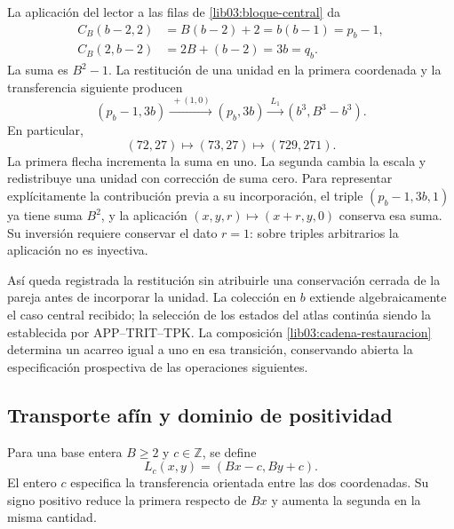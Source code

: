 La aplicación del lector a las filas de \eqref{lib03:bloque-central} da
\begin{align}
 C_B(b-2,2)&=B(b-2)+2=b(b-1)=p_b-1,\\
 C_B(2,b-2)&=2B+(b-2)=3b=q_b.
 \label{lib03:concatenaciones}
\end{align}
La suma es \(B^2-1\). La restitución de una unidad en la primera
coordenada y la transferencia siguiente producen
\begin{equation}
 (p_b-1,3b)\xrightarrow{\ +(1,0)\ }(p_b,3b)
 \xrightarrow{\ L_1\ }(b^3,B^3-b^3).
 \label{lib03:cadena-restauracion}
\end{equation}
En particular,
\begin{equation}
 (72,27)\longmapsto(73,27)\longmapsto(729,271).
 \label{lib03:cadena-central}
\end{equation}
La primera flecha incrementa la suma en uno. La segunda cambia la escala
y redistribuye una unidad con corrección de suma cero. Para representar
explícitamente la contribución previa a su incorporación, el triple
\((p_b-1,3b,1)\) ya tiene suma \(B^2\), y la aplicación
\((x,y,r)\mapsto(x+r,y,0)\) conserva esa suma. Su inversión requiere
conservar el dato \(r=1\): sobre triples arbitrarios la aplicación no
es inyectiva.

Así queda registrada la restitución sin atribuirle una conservación
cerrada de la pareja antes de incorporar la unidad. La colección en \(b\)
extiende algebraicamente el caso central recibido; la selección de los
estados del atlas continúa siendo la establecida por APP--TRIT--TPK.
La composición \eqref{lib03:cadena-restauracion} determina un acarreo
igual a uno en esa transición, conservando abierta la especificación
prospectiva de las operaciones siguientes.

\subsection{Transporte afín y dominio de positividad}
\label{lib03:afin}

\begin{definition}
\label{lib03:def-transporte}
Para una base entera \(B\geq2\) y \(c\in\mathbb Z\), se define
\begin{equation}
 L_c(x,y)=(Bx-c,By+c).
 \label{lib03:lc}
\end{equation}
El entero \(c\) especifica la transferencia orientada entre las dos
coordenadas. Su signo positivo reduce la primera respecto de \(Bx\)
y aumenta la segunda en la misma cantidad.
\end{definition}

